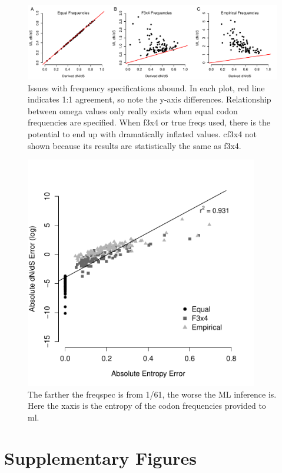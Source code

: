 \documentclass[11pt]{article}
\begin{document}
\bigskip
\begin{figure}[H]
\centerline{\includegraphics[width=6in]{figures/regression_fspec_kappatrue.pdf}}
\caption{\label{reg_fspec} Issues with frequency specifications abound. In each plot, red line indicates 1:1 agreement, so note the y-axis differences. Relationship between omega values only really exists when equal codon frequencies are specified. When f3x4 or true freqs used, there is the potential to end up with dramatically inflated values. cf3x4 not shown because its results are statistically the same as f3x4.}
\end{figure}

\bigskip
\begin{figure}[H]
\centerline{\includegraphics[width=4in]{figures/entropyerror_werror.pdf}}
\caption{\label{entropyerror} The farther the freqspec is from 1/61, the worse the ML inference is. Here the xaxis is the entropy of the codon frequencies provided to ml.}
\end{figure}



\clearpage
\newpage

\section*{Supplementary Figures}
\end{document}
